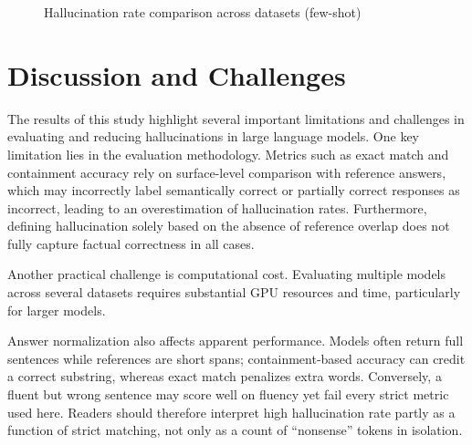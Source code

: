 \documentclass[sigconf,nonacm]{acmart}
\begin{document}
\begin{figure}[H]
\centering
{}
\caption{Hallucination rate comparison across datasets (few-shot)}
\label{fig:fs-hr}
\end{figure}
\endgroup
\FloatBarrier
\raggedbottom

\section{Discussion and Challenges}

The results of this study highlight several important limitations and challenges in evaluating and reducing hallucinations in large language models. One key limitation lies in the evaluation methodology. Metrics such as exact match and containment accuracy rely on surface-level comparison with reference answers, which may incorrectly label semantically correct or partially correct responses as incorrect, leading to an overestimation of hallucination rates. Furthermore, defining hallucination solely based on the absence of reference overlap does not fully capture factual correctness in all cases.

Another practical challenge is computational cost. Evaluating multiple models across several datasets requires substantial GPU resources and time, particularly for larger models.

Answer normalization also affects apparent performance. Models often return full sentences while references are short spans; containment-based accuracy can credit a correct substring, whereas exact match penalizes extra words. Conversely, a fluent but wrong sentence may score well on fluency yet fail every strict metric used here. Readers should therefore interpret high hallucination rate partly as a function of strict matching, not only as a count of ``nonsense'' tokens in isolation.
\end{document}
